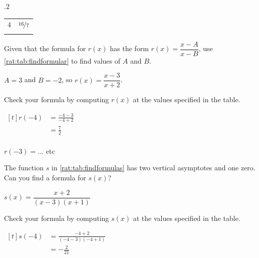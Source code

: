 \begin{exercises}
\begin{problem}
\begin{table}[!htb]
\begin{widepage}
\begin{subtable}{.2\textwidth}
\begin{tabular}{rr}
				 $4$  & $\nicefrac{16}{7}$ \\\lastline
			 \end{tabular}
		 \end{subtable}
		 \end{widepage}
	 \end{table}
	 \begin{subproblem}
		 Given that the formula for $r(x)$ has the form $r(x)=\dfrac{x-A}{x-B}$, use \cref{rat:tab:findformular}
		 to find values of $A$ and $B$.
		 \begin{shortsolution}
			 $A=3$ and $B=-2$, so $r(x)=\dfrac{x-3}{x+2}$.
		 \end{shortsolution}
	 \end{subproblem}
	 \begin{subproblem}
		 Check your formula by computing $r(x)$ at the values specified in the table.
		 \begin{shortsolution}
			 $\begin{aligned}[t]
					 r(-4) & = \frac{-4-3}{-4+2} \\
					       & = \frac{7}{2}       \\
				 \end{aligned}$

			 $r(-3)=\ldots$ etc
		 \end{shortsolution}
	 \end{subproblem}
	 \begin{subproblem}
		 The function $s$ in \cref{rat:tab:findformulas} has two vertical asymptotes and one zero.
		 Can you find a formula for $s(x)$?
		 \begin{shortsolution}
			 $s(x)=\dfrac{x+2}{(x-3)(x+1)}$
		 \end{shortsolution}
	 \end{subproblem}
	 \begin{subproblem}
		 Check your formula by computing $s(x)$ at the values specified in the table.
		 \begin{shortsolution}
			 $\begin{aligned}[t]
					 s(-4) & =\frac{-4+2}{(-4-3)(-4+1)} \\
					       & =-\frac{2}{21}
				 \end{aligned}$


\end{shortsolution}
\end{subproblem}
\end{problem}
\end{exercises}
